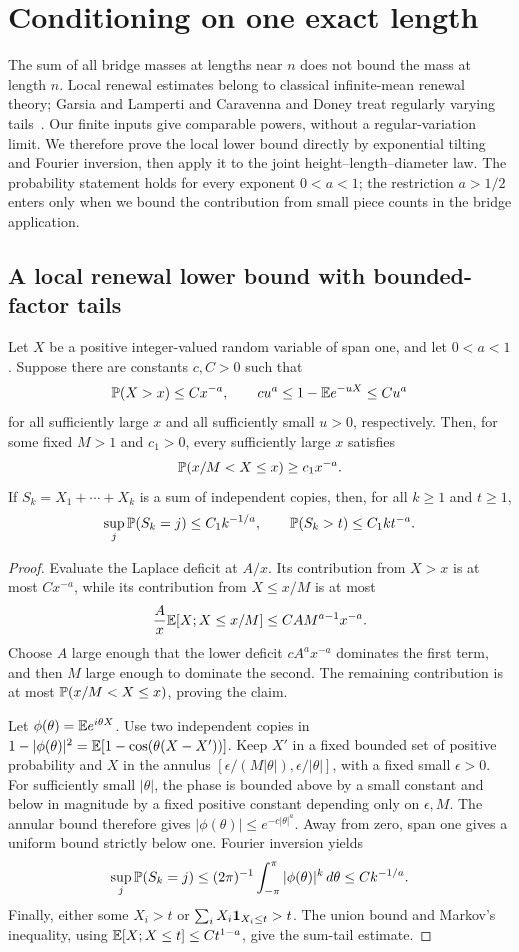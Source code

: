 \section{Conditioning on one exact length}\label{R:sec:exact}
The sum of all bridge masses at lengths near $n$ does not bound the mass at length $n$. Local renewal estimates belong to classical infinite-mean renewal theory; Garsia and Lamperti and Caravenna and Doney treat regularly varying tails~\cite{GarsiaLamperti1962,CaravennaDoney2019}. Our finite inputs give comparable powers, without a regular-variation limit. We therefore prove the local lower bound directly by exponential tilting and Fourier inversion, then apply it to the joint height--length--diameter law. The probability statement holds for every exponent $0<a<1$; the restriction $a>1/2$ enters only when we bound the contribution from small piece counts in the bridge application.

\subsection{A local renewal lower bound with bounded-factor tails}
\begin{lemma}\label{R:exact:concentration}
Let $X$ be a positive integer-valued random variable of span one, and let $0<a<1$. Suppose there are constants $c,C>0$ such that
\[
 \mathbb P(X>x)\le Cx^{-a},\qquad
 c u^a\le1-\mathbb E e^{-uX}\le Cu^a
\]
for all sufficiently large $x$ and all sufficiently small $u>0$, respectively.
Then, for some fixed $M>1$ and $c_1>0$, every sufficiently large $x$ satisfies
\[
 \mathbb P(x/M<X\le x)\ge c_1x^{-a}.
\]
If $S_k=X_1+\cdots+X_k$ is a sum of independent copies, then, for all $k\ge1$ and $t\ge1$,
\[
 \sup_j\mathbb P(S_k=j)\le C_1k^{-1/a},\qquad
 \mathbb P(S_k>t)\le C_1 kt^{-a}.
\]
\end{lemma}
\begin{proof}
Evaluate the Laplace deficit at $A/x$. Its contribution from $X>x$ is at most $Cx^{-a}$, while its contribution from $X\le x/M$ is at most
\[
 \frac A x\mathbb E[X;X\le x/M]\le C A M^{a-1}x^{-a}.
\]
Choose $A$ large enough that the lower deficit $cA^ax^{-a}$ dominates the first term, and then $M$ large enough to dominate the second. The remaining contribution is at most $\mathbb P(x/M<X\le x)$, proving the claim.

Let $\phi(\theta)=\mathbb E e^{i\theta X}$. Use two independent copies in
$1-|\phi(\theta)|^2=\mathbb E[1-\cos(\theta(X-X'))]$. Keep $X'$ in a fixed bounded set of positive probability and $X$ in the annulus $[\epsilon/(M|\theta|),\epsilon/|\theta|]$, with a fixed small $\epsilon>0$. For sufficiently small $|\theta|$, the phase is bounded above by a small constant and below in magnitude by a fixed positive constant depending only on $\epsilon,M$. The annular bound therefore gives
$|\phi(\theta)|\le e^{-c|\theta|^a}$. Away from zero, span one gives a uniform bound strictly below one. Fourier inversion yields
\[
 \sup_j\mathbb P(S_k=j)\le(2\pi)^{-1}\int_{-\pi}^{\pi}|\phi(\theta)|^k\,d\theta
 \le C k^{-1/a}.
\]
Finally, either some $X_i>t$ or $\sum_iX_i\mathbf1_{X_i\le t}>t$. The union bound and Markov's inequality, using $\mathbb E[X;X\le t]\le Ct^{1-a}$, give the sum-tail estimate.
\end{proof}

